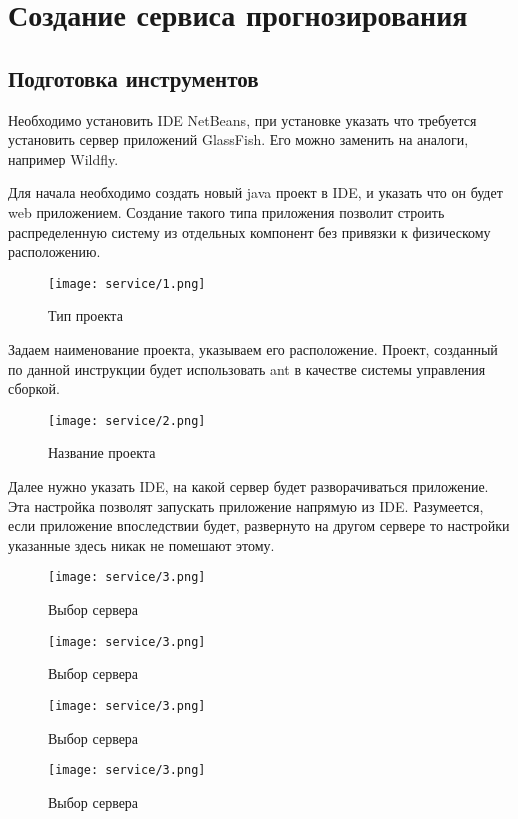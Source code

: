 \linespread{1.13}\selectfont

\chapter{Создание сервиса прогнозирования}
\section{Подготовка инструментов}
Необходимо установить IDE NetBeans, при установке указать что требуется установить сервер приложений GlassFish. Его можно заменить на аналоги, например Wildfly.  

Для начала необходимо создать новый java проект в IDE, и указать что он будет web приложением. Создание такого типа приложения позволит строить распределенную систему из отдельных компонент без привязки к физическому расположению. 

\begin{figure}[h!]
\center
	\texttt{[image: service/1.png]}
	\caption{Тип проекта}
	\label{pict:projecttype}
\end{figure}

Задаем наименование проекта, указываем его расположение. Проект, созданный по данной инструкции будет использовать ant в качестве системы управления сборкой. 

\begin{figure}[h!]
\center
	\texttt{[image: service/2.png]}
	\caption{Название проекта}
	\label{pict:projectname}
\end{figure}

Далее нужно указать IDE, на какой сервер будет разворачиваться приложение. Эта настройка позволят запускать приложение напрямую из IDE. Разумеется, если приложение впоследствии будет, развернуто на другом сервере то настройки указанные здесь никак не помешают этому.

\begin{figure}[h!]
\center
	\texttt{[image: service/3.png]}
	\caption{Выбор сервера}
	\label{pict:projectserver}
\end{figure}

\begin{figure}[h!]
\center
	\texttt{[image: service/3.png]}
	\caption{Выбор сервера}
	\label{pict:projectserver}
\end{figure}

\begin{figure}[h!]
\center
	\texttt{[image: service/3.png]}
	\caption{Выбор сервера}
	\label{pict:projectserver}
\end{figure}

\begin{figure}[h!]
\center
	\texttt{[image: service/3.png]}
	\caption{Выбор сервера}
	\label{pict:projectserver}
\end{figure}

